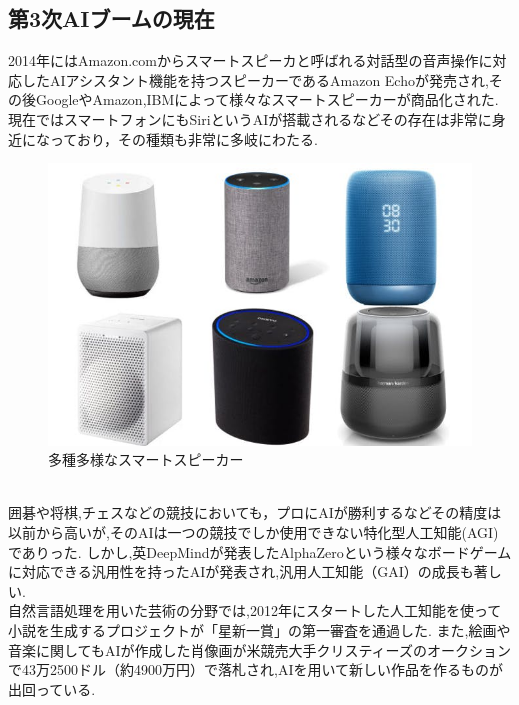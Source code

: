 \subsection{第3次AIブームの現在}
2014年にはAmazon.comからスマートスピーカと呼ばれる対話型の音声操作に対応したAIアシスタント機能を持つスピーカーであるAmazon Echoが発売され,その後GoogleやAmazon,IBMによって様々なスマートスピーカーが商品化された.
現在ではスマートフォンにもSiriというAIが搭載されるなどその存在は非常に身近になっており，その種類も非常に多岐にわたる.
\begin{figure}[!ht]
    \begin{screen}
    \begin{center}
        \includegraphics[scale=0.6, clip]{./img/smartspeaker_list.jpg}
        \caption{多種多様なスマートスピーカー}
        \label{fig:多種多様なスマートスピーカー}
    \end{center}
\end{screen}
\end{figure}\\
囲碁や将棋,チェスなどの競技においても，プロにAIが勝利するなどその精度は以前から高いが,そのAIは一つの競技でしか使用できない特化型人工知能(AGI)でありった.
しかし,英DeepMindが発表したAlphaZeroという様々なボードゲームに対応できる汎用性を持ったAIが発表され,汎用人工知能（GAI）の成長も著しい.\\
自然言語処理を用いた芸術の分野では,2012年にスタートした人工知能を使って小説を生成するプロジェクトが「星新一賞」の第一審査を通過した.\cite{webpage2}
また,絵画や音楽に関してもAIが作成した肖像画が米競売大手クリスティーズのオークションで43万2500ドル（約4900万円）で落札され,AIを用いて新しい作品を作るものが出回っている.\cite{webpage3}\\
